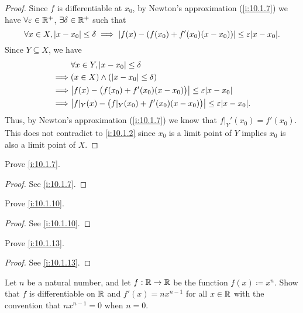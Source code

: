 \begin{proof}
  Since \(f\) is differentiable at \(x_0\), by Newton's approximation (\cref{i:10.1.7}) we have \(\forall \varepsilon \in \mathbb{R}^+\), \(\exists \delta \in \mathbb{R}^+\) such that
  \[
    \forall x \in X, \abs{x - x_0} \leq \delta \implies \abs{f(x) - (f(x_0) + f'(x_0)(x - x_0))} \leq \varepsilon \abs{x - x_0}.
  \]
  Since \(Y \subseteq X\), we have
  \begin{align*}
             & \forall x \in Y, \abs{x - x_0} \leq \delta                                             \\
    \implies & (x \in X) \land (\abs{x - x_0} \leq \delta)                                            \\
    \implies & \abs{f(x) - \big(f(x_0) + f'(x_0)(x - x_0)\big)} \leq \varepsilon \abs{x - x_0}        \\
    \implies & \abs{f|_Y(x) - \big(f|_Y(x_0) + f'(x_0)(x - x_0)\big)} \leq \varepsilon \abs{x - x_0}.
  \end{align*}
  Thus, by Newton's approximation (\cref{i:10.1.7}) we know that \(f|_Y'(x_0) = f'(x_0)\).
  This does not contradict to \cref{i:10.1.2} since \(x_0\) is a limit point of \(Y\) implies \(x_0\) is also a limit point of \(X\).
\end{proof}

\begin{ex}\label{i:ex:10.1.2}
  Prove \cref{i:10.1.7}.
\end{ex}

\begin{proof}
  See \cref{i:10.1.7}.
\end{proof}

\begin{ex}\label{i:ex:10.1.3}
  Prove \cref{i:10.1.10}.
\end{ex}

\begin{proof}
  See \cref{i:10.1.10}.
\end{proof}

\begin{ex}\label{i:ex:10.1.4}
  Prove \cref{i:10.1.13}.
\end{ex}

\begin{proof}
  See \cref{i:10.1.13}.
\end{proof}

\begin{ex}\label{i:ex:10.1.5}
  Let \(n\) be a natural number, and let \(f : \mathbb{R} \to \mathbb{R}\) be the function \(f(x) \coloneqq x^n\).
  Show that \(f\) is differentiable on \(\mathbb{R}\) and \(f'(x) = n x^{n - 1}\) for all \(x \in \mathbb{R}\) with the convention that \(n x^{n - 1} = 0\) when \(n = 0\).
\end{ex}

